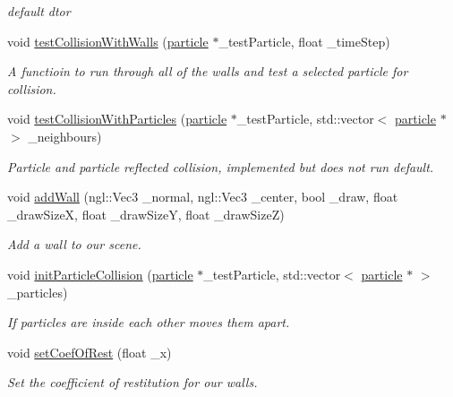 \begin{DoxyCompactItemize}
\begin{DoxyCompactList}\small\item\em default dtor \end{DoxyCompactList}\item 
void \hyperlink{classcollision_ad072407fb933f9b1898ef8171c18387c}{test\-Collision\-With\-Walls} (\hyperlink{classparticle}{particle} $\ast$\-\_\-test\-Particle, float \-\_\-time\-Step)
\begin{DoxyCompactList}\small\item\em A functioin to run through all of the walls and test a selected particle for collision. \end{DoxyCompactList}\item 
void \hyperlink{classcollision_a059c75126f696331e5aa72eb21901df8}{test\-Collision\-With\-Particles} (\hyperlink{classparticle}{particle} $\ast$\-\_\-test\-Particle, std\-::vector$<$ \hyperlink{classparticle}{particle} $\ast$ $>$ \-\_\-neighbours)
\begin{DoxyCompactList}\small\item\em Particle and particle reflected collision, implemented but does not run default. \end{DoxyCompactList}\item 
void \hyperlink{classcollision_afe7fd826adf06477522d5e24deef1064}{add\-Wall} (ngl\-::\-Vec3 \-\_\-normal, ngl\-::\-Vec3 \-\_\-center, bool \-\_\-draw, float \-\_\-draw\-Size\-X, float \-\_\-draw\-Size\-Y, float \-\_\-draw\-Size\-Z)
\begin{DoxyCompactList}\small\item\em Add a wall to our scene. \end{DoxyCompactList}\item 
void \hyperlink{classcollision_aaac9bc58b2e48f7c262fa1efe834eb4c}{init\-Particle\-Collision} (\hyperlink{classparticle}{particle} $\ast$\-\_\-test\-Particle, std\-::vector$<$ \hyperlink{classparticle}{particle} $\ast$ $>$ \-\_\-particles)
\begin{DoxyCompactList}\small\item\em If particles are inside each other moves them apart. \end{DoxyCompactList}\item 
void \hyperlink{classcollision_add27363d174ede208c840b8eb284a34a}{set\-Coef\-Of\-Rest} (float \-\_\-x)
\begin{DoxyCompactList}\small\item\em Set the coefficient of restitution for our walls. \end{DoxyCompactList}\item 

\end{DoxyCompactItemize}

